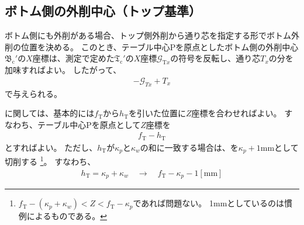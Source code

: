 \subsection{ボトム側の外削中心（トップ基準）}
ボトム側にも外削がある場合、トップ側外削から通り芯を指定する形でボトム外削の位置を決める。
このとき、テーブル中心Pを原点としたボトム側の外削中心$\mathfrak B_\mathrm c'$の$X$座標は、測定で定めた$\mathfrak T_\mathrm c'$の$X$座標$\mathcal G_{\mathrm Tx}$の符号を反転し、通り芯$T_x$の分を加味すればよい。
したがって、
\begin{align}
  \label{eq:TbasedTx}
  -\mathcal G_{Tx}+T_x
\end{align}
で与えられる。



\clearpage
\modHeadsection{\TopOutcutLength}
\TopOutcutLength に関しては、基本的には\AlocationLength$f_\mathrm T$から\TopOutcutLength$h_\mathrm T$を引いた位置に$Z$座標を合わせればよい。
すなわち、テーブル中心Pを原点として$Z$座標を
\begin{align*}
  f_\mathrm T - h_\mathrm T
\end{align*}
とすればよい。
ただし、\TopOutcutLength$h_\mathrm T$が\KeywayPos$\kappa_p$と\KeywayWidth$\kappa_w$の和に一致する場合は、\TopOutcutLength を$\kappa_p+1$mmとして切削する
\footnote{$f_\mathrm T-(\kappa_p+\kappa_w) < Z < f_\mathrm T-\kappa_p$であれば問題ない。
1mmとしているのは慣例によるものである。}。
すなわち、
\begin{align*}
  h_\mathrm T = \kappa_p+\kappa_w \quad \longrightarrow \quad f_\mathrm T-\kappa_p-1[\mathrm{mm}]
\end{align*}



